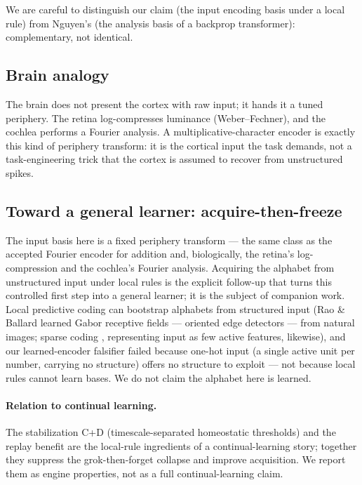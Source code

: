 \documentclass[11pt]{article}
\begin{document}
We are careful to distinguish our claim (the input encoding basis under a local rule) from Nguyen's (the analysis basis of a backprop transformer): complementary, not identical.

\subsection{Brain analogy}\label{sec:brain}
The brain does not present the cortex with raw input; it hands it a tuned periphery. The retina log-compresses luminance (Weber--Fechner), and the cochlea performs a Fourier analysis. A multiplicative-character encoder is exactly this kind of periphery transform: it is the cortical input the task demands, not a task-engineering trick that the cortex is assumed to recover from unstructured spikes.

\subsection{Toward a general learner: acquire-then-freeze}\label{sec:generallearner}
The input basis here is a fixed periphery transform --- the same class as the accepted Fourier encoder for addition and, biologically, the retina's log-compression and the cochlea's Fourier analysis. Acquiring the alphabet from unstructured input under local rules is the explicit follow-up that turns this controlled first step into a general learner; it is the subject of companion work. Local predictive coding can bootstrap alphabets from structured input (Rao \& Ballard \cite{raoballard1999} learned Gabor receptive fields --- oriented edge detectors --- from natural images; sparse coding \cite{olshausen1996}, representing input as few active features, likewise), and our learned-encoder falsifier failed because one-hot input (a single active unit per number, carrying no structure) offers no structure to exploit --- not because local rules cannot learn bases. We do not claim the alphabet here is learned.

\paragraph{Relation to continual learning.}
The stabilization C+D (timescale-separated homeostatic thresholds) and the replay benefit are the local-rule ingredients of a continual-learning story; together they suppress the grok-then-forget collapse and improve acquisition. We report them as engine properties, not as a full continual-learning claim.
\end{document}
